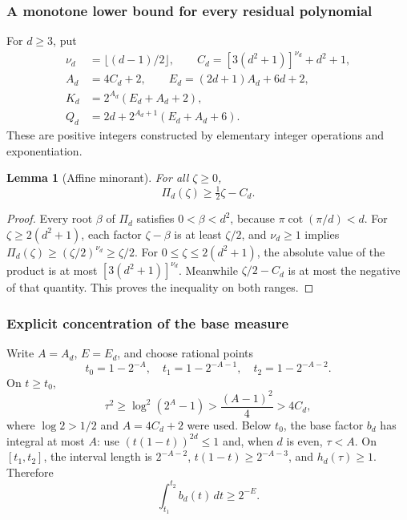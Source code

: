 \documentclass[11pt,a4paper]{article}
\numberwithin{equation}{section}
\newtheorem{lemma}[theorem]{Lemma}
\theoremstyle{definition}
\theoremstyle{remark}
\theoremstyle{plain}
\begin{document}
\subsubsection{A monotone lower bound for every residual polynomial}
For $d\ge3$, put
\begin{equation}\label{xxb:dc:eq:constants}
 \begin{split}
 \nu_d&=\lfloor(d-1)/2\rfloor,\qquad
 C_d=[3(d^2+1)]^{\nu_d}+d^2+1,\\
 A_d&=4C_d+2,\qquad E_d=(2d+1)A_d+6d+2,\\
 K_d&=2^{A_d}(E_d+A_d+2),\\
 Q_d&=2d+2^{A_d+1}(E_d+A_d+6).
 \end{split}
\end{equation}
These are positive integers constructed by elementary integer operations
and exponentiation.

\begin{lemma}[Affine minorant]\label{xxb:dc:lem:minorant}
For all $\zeta\ge0$,
\begin{equation}\label{xxb:dc:eq:minorant}
 \Pi_d(\zeta)\ge\tfrac12\zeta-C_d.
\end{equation}
\end{lemma}
\begin{proof}
Every root $\beta$ of $\Pi_d$ satisfies $0<\beta<d^2$, because
$\pi\cot(\pi/d)<d$.  For $\zeta\ge2(d^2+1)$, each factor $\zeta-\beta$ is at
least $\zeta/2$, and $\nu_d\ge1$ implies $\Pi_d(\zeta)\ge(\zeta/2)^{\nu_d}\ge\zeta/2$.
For $0\le\zeta\le2(d^2+1)$, the absolute value of the product is at most
$[3(d^2+1)]^{\nu_d}$.  Meanwhile $\zeta/2-C_d$ is at most the negative of that
quantity.  This proves the inequality on both ranges.
\end{proof}

\subsubsection{Explicit concentration of the base measure}
Write $A=A_d$, $E=E_d$, and choose rational points
\[
 t_0=1-2^{-A},\quad t_1=1-2^{-A-1},\quad t_2=1-2^{-A-2}.
\]
On $t\ge t_0$,
\begin{equation}\label{xxb:dc:eq:largeL}
 \tau^2\ge\log^2(2^A-1)>\frac{(A-1)^2}{4}>4C_d,
\end{equation}
where $\log2>1/2$ and $A=4C_d+2$ were used.
Below $t_0$, the base factor $b_d$ has integral at most $A$: use
$(t(1-t))^{2d}\le1$ and, when $d$ is even, $\tau<A$.
On $[t_1,t_2]$, the interval length is $2^{-A-2}$,
$t(1-t)\ge2^{-A-3}$, and $h_d(\tau)\ge1$.  Therefore
\begin{equation}\label{xxb:dc:eq:base-mass}
 \int_{t_1}^{t_2}b_d(t)\,dt\ge2^{-E}.
\end{equation}
\end{document}
